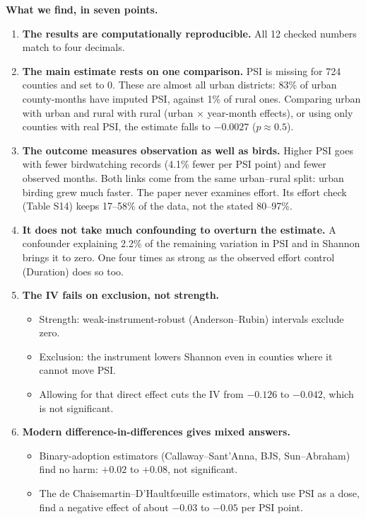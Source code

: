\documentclass[11pt]{article}
\begin{document}
\begin{answerbox}
\textbf{What we find, in seven points.}
\begin{enumerate}[leftmargin=16pt,itemsep=2pt,topsep=2pt]
\item \textbf{The results are computationally reproducible.} All 12 checked numbers match to four decimals.
\item \textbf{The main estimate rests on one comparison.} PSI is missing for 724 counties and set to 0. These are almost all urban districts: 83\% of urban county-months have imputed PSI, against 1\% of rural ones. Comparing urban with urban and rural with rural (urban $\times$ year-month effects), or using only counties with real PSI, the estimate falls to $-0.0027$ ($p\approx0.5$).
\item \textbf{The outcome measures observation as well as birds.} Higher PSI goes with fewer birdwatching records (4.1\% fewer per PSI point) and fewer observed months. Both links come from the same urban--rural split: urban birding grew much faster. The paper never examines effort. Its effort check (Table S14) keeps 17--58\% of the data, not the stated 80--97\%.
\item \textbf{It does not take much confounding to overturn the estimate.} A confounder explaining 2.2\% of the remaining variation in PSI and in Shannon brings it to zero. One four times as strong as the observed effort control (Duration) does so too.
\item \textbf{The IV fails on exclusion, not strength.}
\begin{itemize}[leftmargin=12pt,itemsep=1pt]
\item Strength: weak-instrument-robust (Anderson--Rubin) intervals exclude zero.
\item Exclusion: the instrument lowers Shannon even in counties where it cannot move PSI.
\item Allowing for that direct effect cuts the IV from $-0.126$ to $-0.042$, which is not significant.
\end{itemize}
\item \textbf{Modern difference-in-differences gives mixed answers.}
\begin{itemize}[leftmargin=12pt,itemsep=1pt]
\item Binary-adoption estimators (Callaway--Sant'Anna, BJS, Sun--Abraham) find no harm: $+0.02$ to $+0.08$, not significant.
\item The de Chaisemartin--D'Haultf\oe uille estimators, which use PSI as a dose, find a negative effect of about $-0.03$ to $-0.05$ per PSI point.

\end{itemize}
\end{enumerate}
\end{answerbox}
\end{document}
